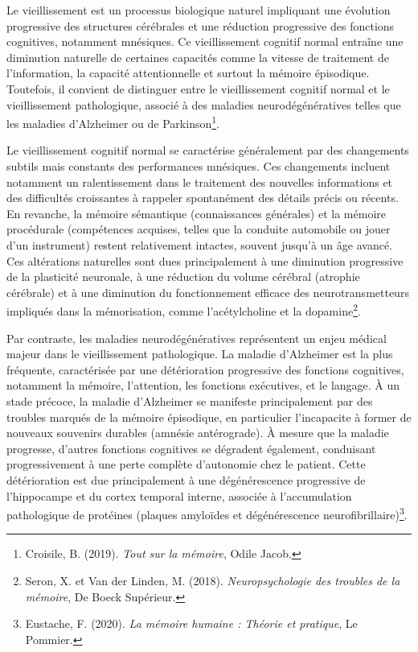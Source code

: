 \documentclass[12pt,a4paper]{report}
\begin{document}
Le vieillissement est un processus biologique naturel impliquant une évolution progressive des structures cérébrales et une réduction progressive des fonctions cognitives, notamment mnésiques. Ce vieillissement cognitif normal entraîne une diminution naturelle de certaines capacités comme la vitesse de traitement de l'information, la capacité attentionnelle et surtout la mémoire épisodique. Toutefois, il convient de distinguer entre le vieillissement cognitif normal et le vieillissement pathologique, associé à des maladies neurodégénératives telles que les maladies d’Alzheimer ou de Parkinson\footnote{Croisile, B. (2019). \textit{Tout sur la mémoire}, Odile Jacob.}.

Le vieillissement cognitif normal se caractérise généralement par des changements subtils mais constants des performances mnésiques. Ces changements incluent notamment un ralentissement dans le traitement des nouvelles informations et des difficultés croissantes à rappeler spontanément des détails précis ou récents. En revanche, la mémoire sémantique (connaissances générales) et la mémoire procédurale (compétences acquises, telles que la conduite automobile ou jouer d'un instrument) restent relativement intactes, souvent jusqu'à un âge avancé. Ces altérations naturelles sont dues principalement à une diminution progressive de la plasticité neuronale, à une réduction du volume cérébral (atrophie cérébrale) et à une diminution du fonctionnement efficace des neurotransmetteurs impliqués dans la mémorisation, comme l’acétylcholine et la dopamine\footnote{Seron, X. et Van der Linden, M. (2018). \textit{Neuropsychologie des troubles de la mémoire}, De Boeck Supérieur.}.

Par contraste, les maladies neurodégénératives représentent un enjeu médical majeur dans le vieillissement pathologique. La maladie d'Alzheimer est la plus fréquente, caractérisée par une détérioration progressive des fonctions cognitives, notamment la mémoire, l’attention, les fonctions exécutives, et le langage. À un stade précoce, la maladie d'Alzheimer se manifeste principalement par des troubles marqués de la mémoire épisodique, en particulier l’incapacite à former de nouveaux souvenirs durables (amnésie antérograde). À mesure que la maladie progresse, d'autres fonctions cognitives se dégradent également, conduisant progressivement à une perte complète d’autonomie chez le patient. Cette détérioration est due principalement à une dégénérescence progressive de l’hippocampe et du cortex temporal interne, associée à l’accumulation pathologique de protéines (plaques amyloïdes et dégénérescence neurofibrillaire)\footnote{Eustache, F. (2020). \textit{La mémoire humaine : Théorie et pratique}, Le Pommier.}.
\end{document}
